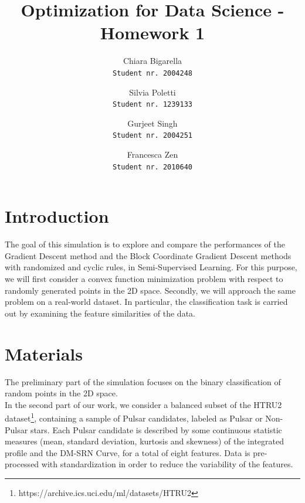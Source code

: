 \documentclass[10pt,twocolumn,letterpaper]{article}
\begin{document}
\title{Optimization for Data Science - Homework 1}
\author{Chiara Bigarella\\{\tt\footnotesize Student nr. 2004248}\and Silvia Poletti\\{\tt\footnotesize Student nr. 1239133}\and Gurjeet Singh\\{\tt\footnotesize Student nr. 2004251}\and Francesca Zen\\{\tt\footnotesize Student nr. 2010640}}
\maketitle

\section{Introduction}
The goal of this simulation is to explore and compare the performances of the Gradient Descent method and the Block Coordinate Gradient Descent methods with randomized and cyclic rules, in Semi-Supervised Learning. For this purpose, we will first consider a convex function minimization problem with respect to randomly generated points in the 2D space. Secondly, we will approach the same problem on a real-world dataset. In particular, the classification task is carried out by examining the feature similarities of the data.

\section{Materials}
The preliminary part of the simulation focuses on the binary classification of random points in the 2D space.\\ 
In the second part of our work, we consider a balanced subset of the HTRU2 dataset\footnote{https://archive.ics.uci.edu/ml/datasets/HTRU2}, containing a sample of Pulsar candidates, labeled as Pulsar or Non-Pulsar stars. Each Pulsar candidate is described by some continuous statistic measures (mean, standard deviation, kurtosis and skewness) of the integrated profile and the DM-SRN Curve, for a total of eight features. Data is pre-processed with standardization in order to reduce the variability of the features.\\
\end{document}
